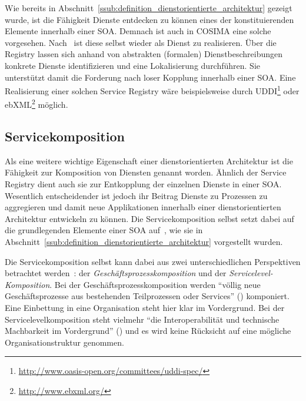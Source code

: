   Wie bereits in Abschnitt~\ref{ssub:definition_dienstorientierte_architektur} gezeigt wurde, ist die Fähigkeit Dienste entdecken zu können eines der konstituierenden Elemente innerhalb einer SOA. Demnach ist auch in COSIMA eine solche vorgesehen. Nach~\citep{service_oriented_computing} ist diese selbst wieder als Dienst zu realisieren. Über die Registry lassen sich anhand von abstrakten (formalen) Dienstbeschreibungen konkrete Dienste identifizieren und eine Lokalisierung durchführen. Sie unterstützt damit die Forderung nach loser Kopplung innerhalb einer SOA. Eine Realisierung einer solchen Service Registry wäre beispielsweise durch UDDI\footnote{\url{http://www.oasis-open.org/committees/uddi-spec/}} oder ebXML\footnote{\url{http://www.ebxml.org/}} möglich.


\subsection{Servicekomposition} %
\label{sub:service_komposition}

  Als eine weitere wichtige Eigenschaft einer dienstorientierten Architektur ist die Fähigkeit zur Komposition von Diensten genannt worden. Ähnlich der Service Registry dient auch sie zur Entkopplung der einzelnen Dienste in einer SOA. Wesentlich entscheidender ist jedoch ihr Beitrag Dienste zu Prozessen zu aggregieren und damit neue Applikationen innerhalb einer dienstorientierten Architektur entwickeln zu können. Die Servicekomposition selbst setzt dabei auf die grundlegenden Elemente einer SOA auf~\citep[S. 51]{milanovic2004csw}, wie sie in Abschnitt~\ref{ssub:definition_dienstorientierte_architektur} vorgestellt wurden.
    
  Die Servicekomposition selbst kann dabei aus zwei unterschiedlichen Perspektiven betrachtet werden~\citep[S. 104]{masak2007ssb}: der \emph{Geschäftsprozesskomposition} und der \emph{Servicelevel-Komposition}. Bei der Geschäftsprozesskomposition werden "`völlig neue Geschäftsprozesse aus bestehenden Teilprozessen oder Services"' (\citep[S. 104]{masak2007ssb}) komponiert. Eine Einbettung in eine Organisation steht hier klar im Vordergrund. Bei der Servicelevelkomposition steht vielmehr "`die Interoperabilität und technische Machbarkeit im Vordergrund"' (\citep[S. 105]{masak2007ssb}) und es wird keine Rücksicht auf eine mögliche Organisationstruktur genommen.
  
